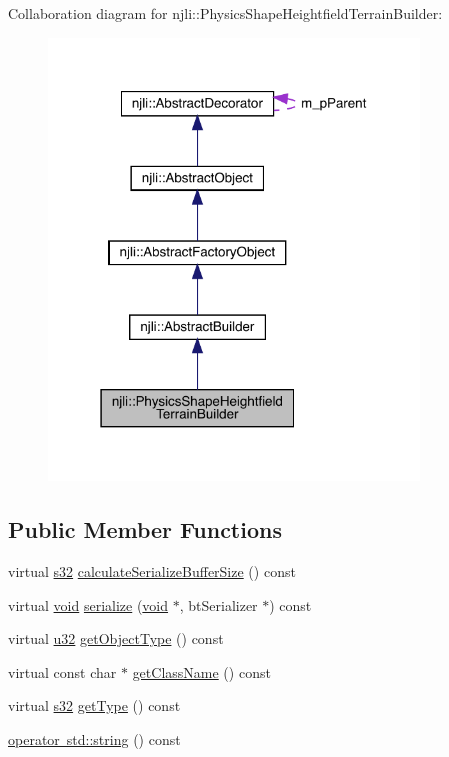 Collaboration diagram for njli\+:\+:Physics\+Shape\+Heightfield\+Terrain\+Builder\+:\nopagebreak
\begin{figure}[H]
\begin{center}
\leavevmode
\includegraphics[width=279pt]{classnjli_1_1_physics_shape_heightfield_terrain_builder__coll__graph}
\end{center}
\end{figure}
\subsection*{Public Member Functions}
\begin{DoxyCompactItemize}
\item 
virtual \mbox{\hyperlink{_util_8h_aa62c75d314a0d1f37f79c4b73b2292e2}{s32}} \mbox{\hyperlink{classnjli_1_1_physics_shape_heightfield_terrain_builder_a8e2a29e4482f49f15071c30ec28ed790}{calculate\+Serialize\+Buffer\+Size}} () const
\item 
virtual \mbox{\hyperlink{_thread_8h_af1e856da2e658414cb2456cb6f7ebc66}{void}} \mbox{\hyperlink{classnjli_1_1_physics_shape_heightfield_terrain_builder_a669b6c5d74788b88902c69a54ee59e9c}{serialize}} (\mbox{\hyperlink{_thread_8h_af1e856da2e658414cb2456cb6f7ebc66}{void}} $\ast$, bt\+Serializer $\ast$) const
\item 
virtual \mbox{\hyperlink{_util_8h_a10e94b422ef0c20dcdec20d31a1f5049}{u32}} \mbox{\hyperlink{classnjli_1_1_physics_shape_heightfield_terrain_builder_a8190b068102560bacebb79a4338e212a}{get\+Object\+Type}} () const
\item 
virtual const char $\ast$ \mbox{\hyperlink{classnjli_1_1_physics_shape_heightfield_terrain_builder_ac0cd372ed65e9f98804721ebbc5ebab2}{get\+Class\+Name}} () const
\item 
virtual \mbox{\hyperlink{_util_8h_aa62c75d314a0d1f37f79c4b73b2292e2}{s32}} \mbox{\hyperlink{classnjli_1_1_physics_shape_heightfield_terrain_builder_a23e1dd10eae6896b1be6e76fdba275dc}{get\+Type}} () const
\item 
\mbox{\hyperlink{classnjli_1_1_physics_shape_heightfield_terrain_builder_af425de5941b36c0d9afc92be971a45dc}{operator std\+::string}} () const
\end{DoxyCompactItemize}
